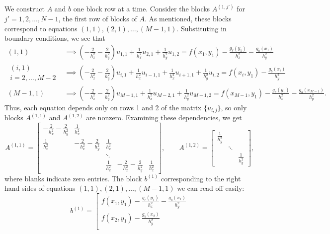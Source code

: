 \documentclass{homework}
\begin{document}
\begin{alphaparts}
		We construct $A$ and $b$ one block row at a time. Consider the blocks $A^{(1,j')}$ for $j'=1,2,\dots, N-1$, the first row of blocks of $A$. As mentioned, these blocks correspond to equations $(1,1),(2,1), \dots, (M-1,1)$. Substituting in boundary conditions, we see that
		\begin{align*}
			(1,1) &\implies \left(-\frac{2}{h_x^2}-\frac{2}{h_y^2}\right)u_{1,1} + \frac{1}{h_x^2}u_{2,1} + \frac{1}{h_y^2}u_{1,2} = f(x_1,y_1) - \frac{g_\ell(y_1)}{h_x^2} - \frac{g_b(x_1)}{h_y^2} \\
			\substack{(i,1) \\ i=2,\dots,M-2} &\implies \left(-\frac{2}{h_x^2}-\frac{2}{h_y^2}\right)u_{i,1} + \frac{1}{h_x^2}u_{i-1,1} + \frac{1}{h_x^2}u_{i+1,1} + \frac{1}{h_y^2}u_{i,2} = f(x_i,y_1) - \frac{g_b(x_i)}{h_y^2} \\
			(M-1,1) &\implies \left(-\frac{2}{h_x^2}-\frac{2}{h_y^2}\right)u_{M-1,1} + \frac{1}{h_x^2}u_{M-2,1} + \frac{1}{h_y^2}u_{M-1,2} = f(x_{M-1}, y_1) - \frac{g_r(y_1)}{h_x^2} - \frac{g_b(x_{M-1})}{h_y^2}.
		\end{align*}
		Thus, each equation depends only on rows 1 and 2 of the matrix $\{u_{i,j}\}$, so only blocks $A^{(1,1)}$ and $A^{(1,2)}$ are nonzero. Examining these dependencies, we get
		\begin{equation*}
			A^{(1,1)} = \left[\begin{matrix}
				-\frac{2}{h_x^2}-\frac{2}{h_y^2} & \frac{1}{h_x^2} \\
				\frac{1}{h_x^2} & -\frac{2}{h_x^2}-\frac{2}{h_y^2} & \frac{1}{h_x^2} \\
				& & \ddots \\
				& & \frac{1}{h_x^2} & -\frac{2}{h_x^2}-\frac{2}{h_y^2}  & \frac{1}{h_x^2}
			\end{matrix}\right], \qquad
			A^{(1,2)} = \left[\begin{matrix}\frac{1}{h_y^2} \\ & \ddots \\ & & \frac{1}{h_y^2} \end{matrix}\right],
		\end{equation*}
		where blanks indicate zero entries. The block $b^{(1)}$ corresponding to the right hand sides of equations $(1,1),(2,1), \dots, (M-1,1)$ we can read off easily:
		\begin{equation*}
			b^{(1)} = \left[\begin{matrix}
				f(x_1,y_1) - \frac{g_\ell(y_1)}{h_x^2} - \frac{g_b(x_1)}{h_y^2} \\
				f(x_2,y_1) - \frac{g_b(x_2)}{h_y^2} \\

\end{matrix}
\end{equation*}
\end{alphaparts}
\end{document}
